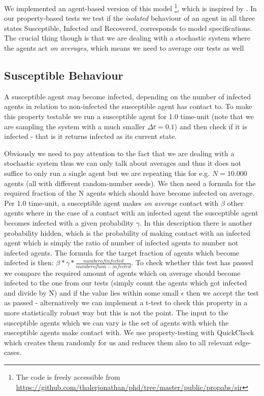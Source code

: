 We implemented an agent-based version of this model \footnote{The code is freely accessible from \url{https://github.com/thalerjonathan/phd/tree/master/public/propabs/sir}}, which is inspired by \cite{macal_agent-based_2010}. In our property-based tests we test if the \textit{isolated} behaviour of an agent in all three states Susceptible, Infected and Recovered, corresponds to model specifications. The crucial thing though is that we are dealing with a stochastic system where the agents act \textit{on averages}, which means we need to average our tests as well 

\subsection{Susceptible Behaviour}
A susceptible agent \textit{may} become infected, depending on the number of infected agents in relation to non-infected the susceptible agent has contact to. To make this property testable we run a susceptible agent for 1.0 time-unit (note that we are sampling the system with a much smaller $\Delta t = 0.1$) and then check if it is infected - that is it returns infected as its current state. 

Obviously we need to pay attention to the fact that we are dealing with a stochastic system thus we can only talk about averages and thus it does not suffice to only run a single agent but we are repeating this for e.g. $N = 10.000$ agents (all with different random-number seeds). We then need a formula for the required fraction of the N agents which should have become infected on average. Per 1.0 time-unit, a susceptible agent makes \textit{on average} contact with $\beta$ other agents where in the case of a contact with an infected agent the susceptible agent becomes infected with a given probability $\gamma$. In this description there is another probability hidden, which is the probability of making contact with an infected agent which is simply the ratio of number of infected agents to number not infected agents. The formula for the target fraction of agents which become infected is then: $\beta * \gamma * \frac{number of infected}{number of non-infected}$. To check whether this test has passed we compare the required amount of agents which on average should become infected to the one from our tests (simply count the agents which got infected and divide by N) and if the value lies within some small $\epsilon$ then we accept the test as passed - alternatively we can implement a t-test to check this property in a more statistically robust way but this is not the point.
The input to the susceptible agents which we can vary is the set of agents with which the susceptible agents make contact with. We use property-testing with QuickCheck which creates them randomly for us and reduces them also to all relevant edge-cases.

